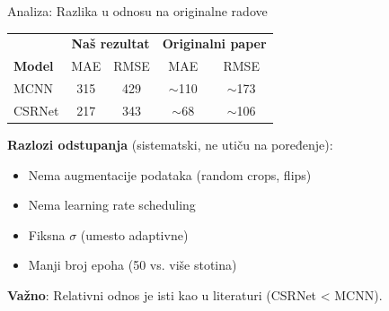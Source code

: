 \documentclass[aspectratio=169]{beamer}
\begin{document}
\begin{frame}{Analiza: Razlika u odnosu na originalne radove}
    \begin{table}
        \centering
        \begin{tabular}{@{}lcc|cc@{}}
            \toprule
            & \multicolumn{2}{c|}{\textbf{Naš rezultat}} & \multicolumn{2}{c}{\textbf{Originalni paper}} \\
            \textbf{Model} & MAE & RMSE & MAE & RMSE \\
            \midrule
            MCNN & 315 & 429 & $\sim$110 & $\sim$173 \\
            CSRNet & 217 & 343 & $\sim$68 & $\sim$106 \\
            \bottomrule
        \end{tabular}
    \end{table}
    
    \vspace{0.3cm}
    \textbf{Razlozi odstupanja} (sistematski, ne utiču na poređenje):
    \begin{itemize}
        \item Nema augmentacije podataka (random crops, flips)
        \item Nema learning rate scheduling
        \item Fiksna $\sigma$ (umesto adaptivne)
        \item Manji broj epoha (50 vs. više stotina)
    \end{itemize}
    
    \textbf{Važno}: Relativni odnos je isti kao u literaturi (CSRNet < MCNN).
\end{frame}
\end{document}
